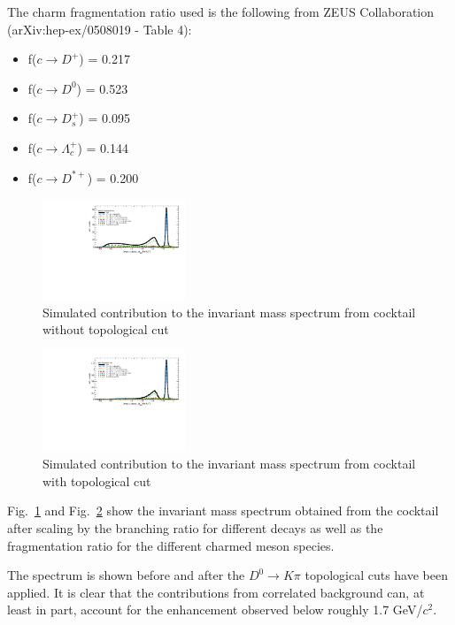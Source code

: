 \documentclass[a4paper]{article}
\begin{document}
The charm fragmentation ratio used is the following from ZEUS Collaboration (arXiv:hep-ex/0508019 - Table 4):

\begin{itemize}
\item f($c \rightarrow D^+$) = 0.217 
\item f($c \rightarrow D^0$) = 0.523 
\item f($c \rightarrow D^+_s$) = 0.095
\item f($c \rightarrow Λ^+_c$) = 0.144
\item f($c \rightarrow D^{*+}$) = 0.200
\end{itemize}

\begin{figure}[htbp]
\centering
\includegraphics[keepaspectratio,width=0.38\textwidth,angle=-90]{fig/D0Bump_without_topo.pdf}
\caption{Simulated contribution to the invariant mass spectrum from cocktail without topological cut}
\label{fig:cocktail1}
\end{figure}

\begin{figure}[htbp]
\centering
\includegraphics[keepaspectratio,width=0.38\textwidth,angle=-90]{fig/D0Bump_with_topo.pdf}
\caption{Simulated contribution to the invariant mass spectrum from cocktail with topological cut}
\label{fig:cocktail2}
\end{figure}

Fig.~\ref{fig:cocktail1} and Fig.~\ref{fig:cocktail2} show the invariant mass spectrum obtained from the cocktail after scaling by the branching ratio for different decays as well as the fragmentation ratio for the different charmed meson species.

The spectrum is shown before and after the $D^0\rightarrow K\pi$ topological cuts have been applied. It is clear that the contributions from correlated background can, at least in part, account for the enhancement observed below roughly 1.7 GeV/$c^2$.
\end{document}
